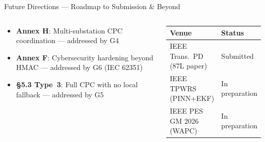 \documentclass[aspectratio=169, 10pt]{beamer}
\begin{document}
\begin{frame}{Future Directions --- Roadmap to Submission \& Beyond}
\begin{columns}[T]
\vspace{6pt}
\begin{tcolorbox}[cpcbox, title={C37.300 Future Gaps to Address}]
{\small
\begin{itemize}\setlength\itemsep{3pt}
  \item[\textbullet] \textbf{Annex H}: Multi-substation CPC coordination --- addressed by G4
  \item[\textbullet] \textbf{Annex F}: Cybersecurity hardening beyond HMAC --- addressed by G6 (IEC 62351)
  \item[\textbullet] \textbf{\S5.3 Type~3}: Full CPC with no local fallback --- addressed by G5
\end{itemize}}
\end{tcolorbox}
\vspace{8pt}
\begin{tcolorbox}[resultbox, title={Publication Pipeline}]
{\footnotesize
\begin{tabular}{ll}
\toprule
\textbf{Venue} & \textbf{Status}\\
\midrule
IEEE Trans.\ PD (87L paper) & Submitted\\
IEEE TPWRS (PINN+EKF)       & In preparation\\
IEEE PES GM 2026 (WAPC)     & In preparation\\
\bottomrule
\end{tabular}}
\end{tcolorbox}
\end{columns}
\end{frame}
\end{document}
